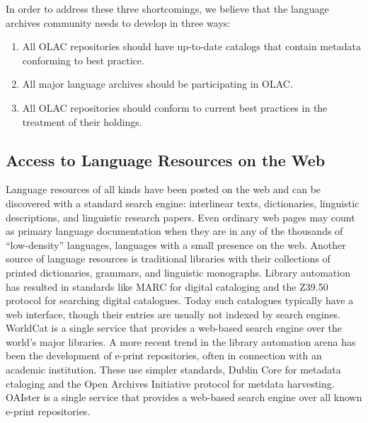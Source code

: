 
In order to address these three shortcomings, we believe that the
language archives community needs to develop in three ways:

\begin{enumerate}\setlength{\itemsep}{0pt}
\item All OLAC repositories should have up-to-date catalogs
      that contain metadata conforming to best practice.
\item All major language archives should be participating in OLAC.
\item All OLAC repositories should conform to current best practices
      in the treatment of their holdings.
\end{enumerate}

\subsection{Access to Language Resources on the Web}


Language resources of all kinds have been posted on the web
and can be discovered with a standard search engine:
interlinear texts, dictionaries, linguistic descriptions, and
linguistic research papers.  Even ordinary web pages may count
as primary language documentation when they are in any of the
thousands of ``low-density'' languages, languages with a small
presence on the web.  Another source of language resources is traditional
libraries with their collections of printed dictionaries, grammars,
and linguistic monographs.  Library automation has resulted in
standards like MARC for digital cataloging and the Z39.50 protocol for 
searching digital catalogues. Today such catalogues typically have a web
interface, though their entries are usually not indexed by search
engines.  WorldCat is a single service that provides a web-based search
engine over the world's major libraries. A more recent trend in the library automation arena has been
the development of e-print repositories, often in connection with an academic institution.  These use simpler standards, Dublin Core for
metadata ctaloging and the Open Archives Initiative protocol for metdata
harvesting.  OAIster is a single service that provides a web-based
search engine over all known e-print repositories.



